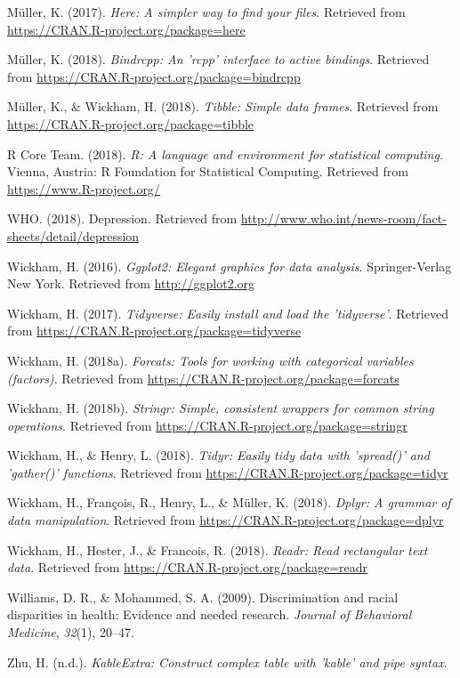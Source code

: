 \documentclass[man]{apa6}
\begin{document}
\hypertarget{ref-R-here}{}
Müller, K. (2017). \emph{Here: A simpler way to find your files}.
Retrieved from \url{https://CRAN.R-project.org/package=here}

\hypertarget{ref-R-bindrcpp}{}
Müller, K. (2018). \emph{Bindrcpp: An 'rcpp' interface to active
bindings}. Retrieved from
\url{https://CRAN.R-project.org/package=bindrcpp}

\hypertarget{ref-R-tibble}{}
Müller, K., \& Wickham, H. (2018). \emph{Tibble: Simple data frames}.
Retrieved from \url{https://CRAN.R-project.org/package=tibble}

\hypertarget{ref-R-base}{}
R Core Team. (2018). \emph{R: A language and environment for statistical
computing}. Vienna, Austria: R Foundation for Statistical Computing.
Retrieved from \url{https://www.R-project.org/}

\hypertarget{ref-who}{}
WHO. (2018). Depression. Retrieved from
\url{http://www.who.int/news-room/fact-sheets/detail/depression}

\hypertarget{ref-R-ggplot2}{}
Wickham, H. (2016). \emph{Ggplot2: Elegant graphics for data analysis}.
Springer-Verlag New York. Retrieved from \url{http://ggplot2.org}

\hypertarget{ref-R-tidyverse}{}
Wickham, H. (2017). \emph{Tidyverse: Easily install and load the
'tidyverse'}. Retrieved from
\url{https://CRAN.R-project.org/package=tidyverse}

\hypertarget{ref-R-forcats}{}
Wickham, H. (2018a). \emph{Forcats: Tools for working with categorical
variables (factors)}. Retrieved from
\url{https://CRAN.R-project.org/package=forcats}

\hypertarget{ref-R-stringr}{}
Wickham, H. (2018b). \emph{Stringr: Simple, consistent wrappers for
common string operations}. Retrieved from
\url{https://CRAN.R-project.org/package=stringr}

\hypertarget{ref-R-tidyr}{}
Wickham, H., \& Henry, L. (2018). \emph{Tidyr: Easily tidy data with
'spread()' and 'gather()' functions}. Retrieved from
\url{https://CRAN.R-project.org/package=tidyr}

\hypertarget{ref-R-dplyr}{}
Wickham, H., François, R., Henry, L., \& Müller, K. (2018). \emph{Dplyr:
A grammar of data manipulation}. Retrieved from
\url{https://CRAN.R-project.org/package=dplyr}

\hypertarget{ref-R-readr}{}
Wickham, H., Hester, J., \& Francois, R. (2018). \emph{Readr: Read
rectangular text data}. Retrieved from
\url{https://CRAN.R-project.org/package=readr}

\hypertarget{ref-williams2009discrimination}{}
Williams, D. R., \& Mohammed, S. A. (2009). Discrimination and racial
disparities in health: Evidence and needed research. \emph{Journal of
Behavioral Medicine}, \emph{32}(1), 20--47.

\hypertarget{ref-R-kableExtra}{}
Zhu, H. (n.d.). \emph{KableExtra: Construct complex table with 'kable'
and pipe syntax}.

\endgroup
\end{document}
